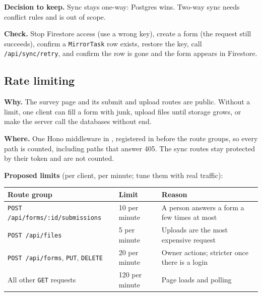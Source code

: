 \documentclass[11pt,a4paper]{article}
\begin{document}
\textbf{Decision to keep.} Sync stays one-way: Postgres wins. Two-way sync needs conflict rules and is out of scope.

\textbf{Check.} Stop Firestore access (use a wrong key), create a form (the request still succeeds), confirm a \texttt{MirrorTask} row exists, restore the key, call \texttt{/api/sync/retry}, and confirm the row is gone and the form appears in Firestore.

\clearpage
\subsection{Rate limiting}
\textbf{Why.} The survey page and its submit and upload routes are public. Without a limit, one client can fill a form with junk, upload files until storage grows, or make the server call the databases without end.

\textbf{Where.} One Hono middleware in , registered in  before the route groups, so every path is counted, including paths that answer 405. The sync routes stay protected by their token and are not counted.

\textbf{Proposed limits} (per client, per minute; tune them with real traffic):
\begin{center}
\begin{tabular}{@{}p{5.8cm}p{3.0cm}p{5.8cm}@{}}
\toprule
\textbf{Route group} & \textbf{Limit} & \textbf{Reason}\\
\midrule
\texttt{POST /api/forms/\allowbreak{}:id/\allowbreak{}submissions} & 10 per minute & A person answers a form a few times at most\\
\texttt{POST /api/files} & 5 per minute & Uploads are the most expensive request\\
\texttt{POST /api/forms}, \texttt{PUT}, \texttt{DELETE} & 20 per minute & Owner actions; stricter once there is a login\\
All other \texttt{GET} requests & 120 per minute & Page loads and polling\\
\bottomrule
\end{tabular}
\end{center}
\end{document}
